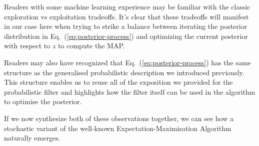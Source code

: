 Readers with some machine learning experience may be familiar with the classic exploration vs exploitation tradeoffs. It's clear that these tradeoffs will manifest in our case here when trying to strike a balance between iterating the posterior distribution in Eq.~(\ref{eq:posterior-process}) and optimizing the current posterior with respect to $z$ to compute the MAP. 

Readers may also have recognized that Eq.~(\ref{eq:posterior-process}) has the same structure as the generalised probabilistic description we introduced previously. This structure enables us to reuse all of the exposition we provided for the probabilistic filter and highlights how the filter itself can be used in the algorithm to optimise the posterior.   

If we now synthesize both of these observations together, we can see how a stochastic variant of the well-known Expectation-Maximisation Algorithm~\cite{hartley1958maximum, dempster1977maximum, murphy2012machine} naturally emerges.


